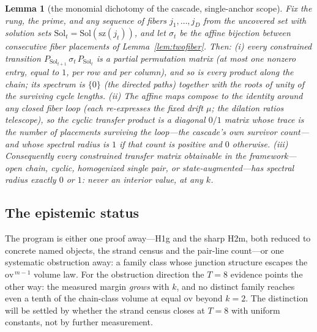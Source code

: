 \documentclass[11pt,a4paper]{article}
\numberwithin{equation}{section}
\theoremstyle{plain}
\theoremstyle{plain}
\newtheorem{lemma}[theorem]{Lemma}
\theoremstyle{definition}
\theoremstyle{remark}
\begin{document}
\begin{lemma}[the monomial dichotomy of the cascade, single-anchor scope]\label{lem:monomial}
Fix the rung, the prime, and any sequence of fibers $j_1,\dots,j_D$
from the uncovered set with solution sets
$\mathrm{Sol}_t=\mathrm{Sol}(\mathrm{sz}(j_t))$, and let $\sigma_t$
be the affine bijection between consecutive fiber placements of
Lemma~\ref{lem:twofiber}. Then: \emph{(i)} every constrained
transition $P_{\mathrm{Sol}_{t+1}}\,\sigma_t\,P_{\mathrm{Sol}_t}$ is
a partial permutation matrix (at most one nonzero entry, equal to $1$,
per row and per column), and so is every product along the chain; its
spectrum is $\{0\}$ (the directed paths) together with the roots of
unity of the surviving cycle lengths. \emph{(ii)} The affine maps
compose to the identity around any closed fiber loop (each re-expresses
the fixed drift $\mu$; the dilation ratios telescope), so the cyclic
transfer product is a diagonal $0/1$ matrix whose trace is the number
of placements surviving the loop---the cascade's own survivor
count---and whose spectral radius is $1$ if that count is positive and
$0$ otherwise. \emph{(iii)} Consequently every constrained transfer
matrix obtainable in the framework---open chain, cyclic, homogenized
single pair, or state-augmented---has spectral radius exactly $0$ or
$1$: never an interior value, at any $k$.
\end{lemma}

\subsection{The epistemic status}\label{sec:scale-status}

The program is either one proof away---H1g and the sharp H2m, both
reduced to concrete named objects, the strand census and the pair-line
count---or one systematic obstruction away: a family class whose
junction structure escapes the $\mathrm{ov}^{\,m-1}$ volume law. For
the obstruction direction the $T=8$ evidence points the other way: the
measured margin \emph{grows} with $k$, and no distinct family reaches
even a tenth of the chain-class volume at equal $\mathrm{ov}$ beyond
$k=2$. The distinction will be settled by whether the strand census
closes at $T=8$ with uniform constants, not by further measurement.
\end{document}
